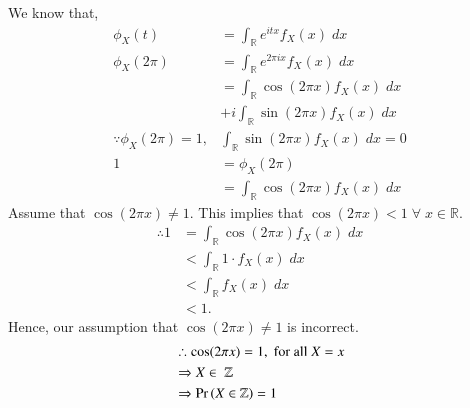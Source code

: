 We know that,
\begin{align}
\phi_X(t) &= \int_\mathbb{R} e^{itx}f_X(x) \; dx\\
\phi_X(2\pi) &= \int_\mathbb{R} e^{2\pi ix}f_X(x) \; dx\\
&= \int_\mathbb{R} \cos(2\pi x) f_X(x) \; dx \nonumber \\
&+ i \int_\mathbb{R} \sin(2 \pi x) f_X(x) \; dx \\
\because \phi_X(2\pi) = 1, & \int_\mathbb{R} \sin(2 \pi x) f_X(x) \; dx = 0\\
1 &= \phi_X(2\pi)\\
&= \int_\mathbb{R} \cos(2\pi x) f_X(x) \; dx
\end{align}
Assume that $\cos(2\pi x) \neq 1$. This implies that $\cos(2\pi x) < 1 \; \forall \; x \in \mathbb{R}$.
\begin{align}
\therefore 1 &= \int_\mathbb{R} \cos(2\pi x) f_X(x) \; dx \\
&< \int_\mathbb{R} 1 \cdot f_X(x) \; dx \\
&< \int_\mathbb{R} f_X(x) \; dx \\
&< 1. \tag{Contradiction}
\end{align}
Hence, our assumption that $\cos(2\pi x) \neq 1$ is incorrect.
\begin{align}
&\therefore \cos(2 \pi x) = 1, \; \text{for all  $X=x$}\\
&\Rightarrow X \in \; \mathbb{Z}\\
&\Rightarrow \Pr\left(X \in \mathbb{Z}\right) = 1
\end{align}
